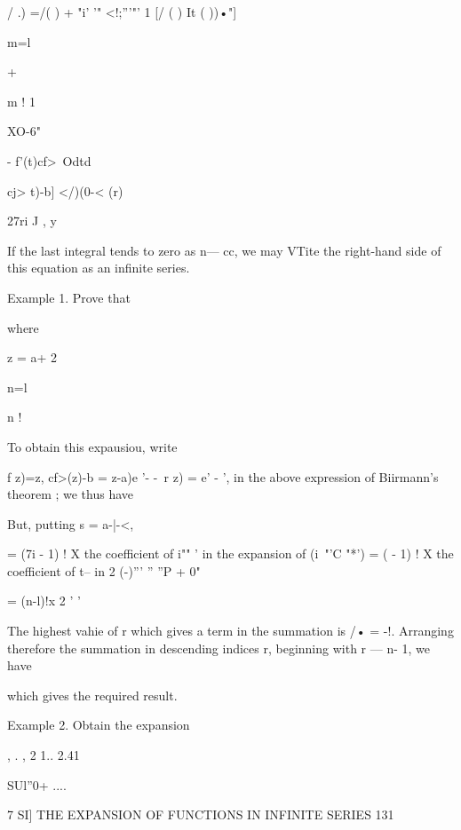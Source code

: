 / .) =/( ) + "i' '"  <!;'''"' 1  [/  ( ) It ( ))•"] 



m=l 



+ 



m ! 
1 



XO-6" 



- f'(t)cf>\ Odtd  



cj> t)-b] </)(0-< (r) 



27ri J   , y 

If the last integral tends to zero as n— cc, we may  VTite the right-hand 
side of this equation as an infinite series. 



Example 1. Prove that 



where 



z = a+ 2 

n=l 



n ! 



To obtain this expausiou, write 

f z)=z, cf>(z)-b =  z-a)e '- -\   r z) = e' - ', 
in the above expression of Biirmann's theorem ; we thus have 

But, putting s = a-|-<, 

= (7i - 1) ! X the coefficient of i"" ' in the expansion of (i~"'C "*') 
= (  - 1) ! X the coefficient of t--  in 2 (-)''' '' ''P  + 0" 

= (n-l)!x 2   '   ' 



The highest vahie of r which gives a term in the summation is /• =  -!. Arranging 
therefore the summation in descending indices r, beginning with r — n- 1, we have 

which gives the required result. 

Example 2. Obtain the expansion 



, . , 2 1.. 2.41 



SUl''0+ .... 



7 SI] THE EXPANSION OF FUNCTIONS IN INFINITE SERIES 131 

